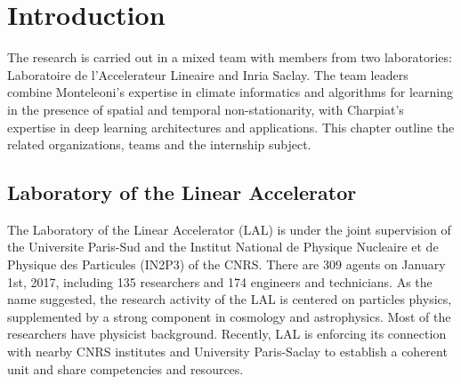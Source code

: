 \chapter{Introduction}
\label{sec:intro}
The research is carried out in a mixed team with members from two laboratories: Laboratoire de l'Accelerateur Lineaire and Inria Saclay. The team leaders combine Monteleoni’s expertise in climate informatics and algorithms for learning in the presence of spatial and temporal non-stationarity, with Charpiat’s expertise in deep learning architectures and applications. This chapter outline the related organizations, teams and the internship subject.

\section{Laboratory of the Linear Accelerator}
\label{sec:laboratory}
The Laboratory of the Linear Accelerator (LAL) is under the joint supervision of the Universite Paris-Sud and the Institut National de Physique Nucleaire et de Physique des Particules (IN2P3) of the CNRS. There are 309 agents on January 1st, 2017, including 135 researchers and 174 engineers and technicians. As the name suggested, the research activity of the LAL is centered on particles physics, supplemented by a strong component in cosmology and astrophysics. Most of the researchers have physicist background. Recently, LAL is enforcing its connection with nearby CNRS institutes and University Paris-Saclay to establish a coherent unit and share competencies and resources. 

